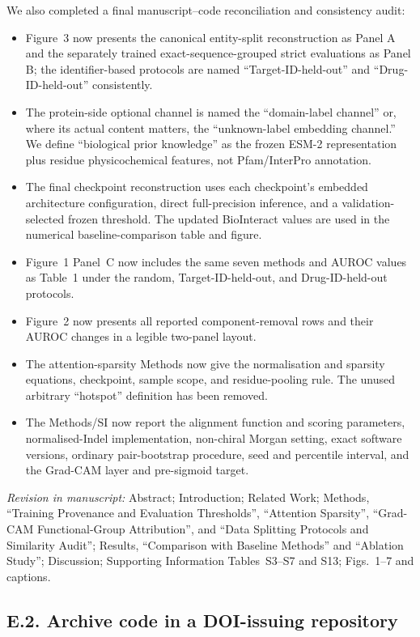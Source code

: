 \documentclass[11pt,a4paper]{article}
\newcommand{\change}[1]{\par\smallskip\noindent\textit{Revision in manuscript:} #1\par\medskip}
\begin{document}
We also completed a final manuscript--code reconciliation and consistency audit:
\begin{itemize}
  \item Figure~3 now presents the canonical entity-split reconstruction as Panel
  A and the separately trained exact-sequence-grouped strict evaluations as
  Panel B; the identifier-based protocols are named ``Target-ID-held-out'' and
  ``Drug-ID-held-out'' consistently.
  \item The protein-side optional channel is named the ``domain-label channel''
  or, where its actual content matters, the ``unknown-label embedding channel.''
  We define ``biological prior knowledge'' as the frozen ESM-2 representation
  plus residue physicochemical features, not Pfam/InterPro annotation.
  \item The final checkpoint reconstruction uses each checkpoint's embedded
  architecture configuration, direct full-precision inference, and a
  validation-selected frozen threshold. The updated BioInteract values are used
  in the numerical baseline-comparison table and figure.
  \item Figure~1 Panel~C now includes the same seven methods and AUROC values as
  Table~1 under the random, Target-ID-held-out, and Drug-ID-held-out protocols.
  \item Figure~2 now presents all reported component-removal rows and their
  AUROC changes in a legible two-panel layout.
  \item The attention-sparsity Methods now give the normalisation and sparsity
  equations, checkpoint, sample scope, and residue-pooling rule. The unused
  arbitrary ``hotspot'' definition has been removed.
  \item The Methods/SI now report the alignment function and scoring parameters,
  normalised-Indel implementation, non-chiral Morgan setting, exact software
  versions, ordinary pair-bootstrap procedure, seed and percentile interval,
  and the Grad-CAM layer and pre-sigmoid target.
\end{itemize}

\change{Abstract; Introduction; Related Work; Methods, ``Training Provenance and
Evaluation Thresholds'', ``Attention Sparsity'', ``Grad-CAM Functional-Group Attribution'',
and ``Data Splitting
Protocols and Similarity Audit''; Results, ``Comparison with Baseline Methods''
and ``Ablation Study''; Discussion;
Supporting Information Tables~S3--S7 and S13; Figs.~1--7 and captions.}

\subsection*{E.2. Archive code in a DOI-issuing repository}
\end{document}
